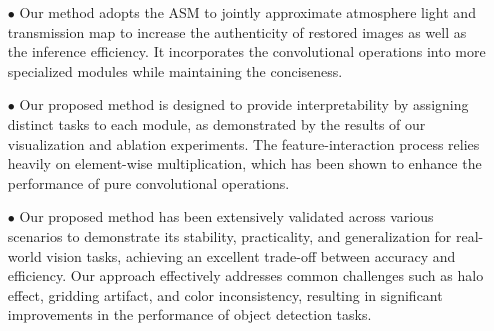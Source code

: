\documentclass[lettersize,journal]{IEEEtran}
\begin{document}
\begin{itemize}
    \item[$\bullet$] Our method adopts the ASM to jointly approximate atmosphere light and transmission map to increase the authenticity of restored images as well as the inference efficiency. It incorporates the convolutional operations into more specialized modules while maintaining the conciseness.    
    \item[$\bullet$] Our proposed method is designed to provide interpretability by assigning distinct tasks to each module, as demonstrated by the results of our visualization and ablation experiments. The feature-interaction process relies heavily on element-wise multiplication, which has been shown to enhance the performance of pure convolutional operations.
    \item[$\bullet$] Our proposed method has been extensively validated across various scenarios to demonstrate its stability, practicality, and generalization for real-world vision tasks, achieving an excellent trade-off between accuracy and efficiency. Our approach effectively addresses common challenges such as halo effect, gridding artifact, and color inconsistency, resulting in significant improvements in the performance of object detection tasks.
\end{itemize}
\end{document}

